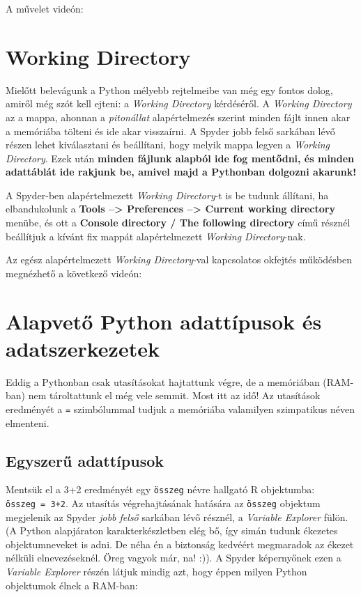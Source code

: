 \documentclass[
]{book}
\begin{document}
A művelet videón:

\section{Working Directory}\label{working-directory}

Mielőtt belevágunk a Python mélyebb rejtelmeibe van még egy fontos dolog, amiről még szót kell ejteni: a \emph{Working Directory} kérdéséről.
A \emph{Working Directory} az a mappa, ahonnan a \emph{pitonállat} alapértelmezés szerint minden fájlt innen akar a memóriába tölteni és ide akar visszaírni.
A Spyder jobb felső sarkában lévő részen lehet kiválasztani és beállítani, hogy melyik mappa legyen a \emph{Working Directory}. Ezek után \textbf{minden fájlunk alapból ide fog mentődni, és minden adattáblát ide rakjunk be, amivel majd a Pythonban dolgozni akarunk!}

A Spyder-ben alapértelmezett \emph{Working Directory}-t is be tudunk állítani, ha elbandukolunk a \textbf{Tools --\textgreater{} Preferences --\textgreater{} Current working directory} menübe, és ott a \textbf{Console directory / The following directory} című résznél beállítjuk a kívánt fix mappát alapértelmezett \emph{Working Directory}-nak.

Az egész alapértelmezett \emph{Working Directory}-val kapcsolatos okfejtés működésben megnézhető a következő videón:

\section{Alapvető Python adattípusok és adatszerkezetek}\label{alapvetux151-python-adattuxedpusok-uxe9s-adatszerkezetek}

Eddig a Pythonban csak utasításokat hajtattunk végre, de a memóriában (RAM-ban) nem tároltattunk el még vele semmit.
Most itt az idő! Az utasítások eredményét a \texttt{=} szimbólummal tudjuk a memóriába valamilyen szimpatikus néven elmenteni.

\subsection{Egyszerű adattípusok}\label{egyszerux171-adattuxedpusok}

Mentsük el a 3+2 eredményét egy \texttt{összeg} névre hallgató R objektumba: \texttt{összeg\ =\ 3+2}. Az utasítás végrehajtásának hatására az \texttt{összeg} objektum megjelenik az Spyder \emph{jobb felső} sarkában lévő résznél, a \emph{Variable Explorer} fülön. (A Python alapjáraton karakterkészletben elég bő, így simán tudunk ékezetes objektumneveket is adni. De néha én a biztonság kedvéért megmaradok az ékezet nélküli elnevezéseknél. Öreg vagyok már, na! :)). A Spyder képernyőnek ezen a \emph{Variable Explorer} részén látjuk mindig azt, hogy éppen milyen Python objektumok élnek a RAM-ban:
\end{document}
